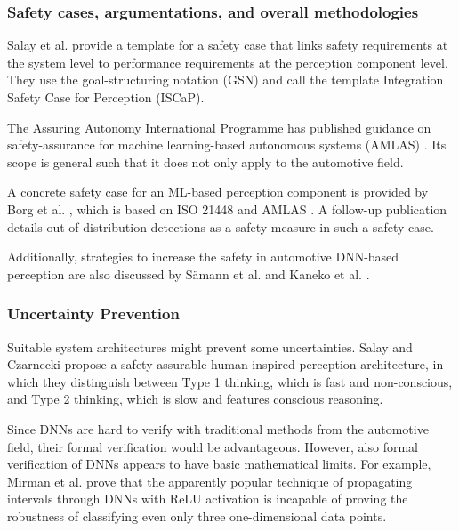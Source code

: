 \documentclass[conference]{IEEEtran}
\newcommand{\new}[1]{{\color{my-red}#1}}
\begin{document}
\subsubsection{\new{Safety cases, argumentations, and overall methodologies}}

Salay et al. \cite{Salay2021missinglink} provide a template for a safety case that links safety requirements at the system level to performance requirements at the perception component level. 
They use the goal-structuring notation (GSN) and call the template Integration Safety Case for Perception (ISCaP).

The Assuring Autonomy International Programme has published guidance on safety-assurance for machine learning-based autonomous systems (AMLAS) \cite{Hawkins2021amlas}. Its scope is general such that it does not only apply to the automotive field.

A concrete safety case for an ML-based perception component is provided by Borg et al. \cite{Borg2022smirk}, which is based on ISO 21448 and AMLAS \cite{Hawkins2021amlas}.
A follow-up publication \cite{Henriksson2023ood} details out-of-distribution detections as a safety measure in such a safety case.


Additionally, strategies to increase the safety in automotive DNN-based perception are also discussed by Sämann et al. \cite{Saemann2020strategy} and Kaneko et al. \cite{Kaneko2023safety}.


\subsubsection{Uncertainty Prevention}
\label{sec:uncertainty_prevention}

Suitable system architectures might prevent some uncertainties. 
Salay and Czarnecki \cite{Salay2022humaninspired} propose a safety assurable human-inspired perception architecture, in which they distinguish between Type 1 thinking, which is fast and non-conscious, and Type 2 thinking, which is slow and features conscious reasoning. 



Since DNNs are hard to verify with traditional methods from the automotive field, their formal verification would be advantageous. 
However, also formal verification of DNNs appears to have basic mathematical limits. 
For example, Mirman et al. \cite{Mirman2021limits} prove that the apparently popular technique of propagating intervals through DNNs with ReLU activation is incapable of proving the robustness of classifying even only three one-dimensional data points.
\end{document}
